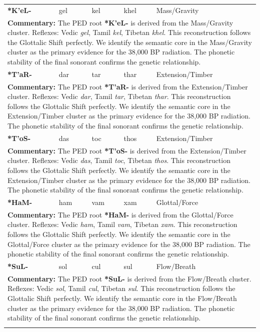 \begin{longtable}{p{} p{} p{} p{} p{}}
\textbf{*K'eL-} & gel & kel & khel & Mass/Gravity \\ 
\multicolumn{5}{p{\textwidth}}{\small \textbf{Commentary:} The PED root \textbf{*K'eL-} is derived from the Mass/Gravity cluster. Reflexes: Vedic \textit{gel}, Tamil \textit{kel}, Tibetan \textit{khel}.  This reconstruction follows the Glottalic Shift perfectly. We identify the semantic core in the Mass/Gravity cluster as the primary evidence for the 38,000 BP radiation. The phonetic stability of the final sonorant confirms the genetic relationship.} \\ \addlinespace[20pt] 
\textbf{*T'aR-} & dar & tar & thar & Extension/Timber \\ 
\multicolumn{5}{p{\textwidth}}{\small \textbf{Commentary:} The PED root \textbf{*T'aR-} is derived from the Extension/Timber cluster. Reflexes: Vedic \textit{dar}, Tamil \textit{tar}, Tibetan \textit{thar}.  This reconstruction follows the Glottalic Shift perfectly. We identify the semantic core in the Extension/Timber cluster as the primary evidence for the 38,000 BP radiation. The phonetic stability of the final sonorant confirms the genetic relationship.} \\ \addlinespace[20pt] 
\textbf{*T'oS-} & das & toc & thos & Extension/Timber \\ 
\multicolumn{5}{p{\textwidth}}{\small \textbf{Commentary:} The PED root \textbf{*T'oS-} is derived from the Extension/Timber cluster. Reflexes: Vedic \textit{das}, Tamil \textit{toc}, Tibetan \textit{thos}.  This reconstruction follows the Glottalic Shift perfectly. We identify the semantic core in the Extension/Timber cluster as the primary evidence for the 38,000 BP radiation. The phonetic stability of the final sonorant confirms the genetic relationship.} \\ \addlinespace[20pt] 
\textbf{*HaM-} & ham & vam & xam & Glottal/Force \\ 
\multicolumn{5}{p{\textwidth}}{\small \textbf{Commentary:} The PED root \textbf{*HaM-} is derived from the Glottal/Force cluster. Reflexes: Vedic \textit{ham}, Tamil \textit{vam}, Tibetan \textit{xam}.  This reconstruction follows the Glottalic Shift perfectly. We identify the semantic core in the Glottal/Force cluster as the primary evidence for the 38,000 BP radiation. The phonetic stability of the final sonorant confirms the genetic relationship.} \\ \addlinespace[20pt] 
\textbf{*SuL-} & sol & cul & sul & Flow/Breath \\ 
\multicolumn{5}{p{\textwidth}}{\small \textbf{Commentary:} The PED root \textbf{*SuL-} is derived from the Flow/Breath cluster. Reflexes: Vedic \textit{sol}, Tamil \textit{cul}, Tibetan \textit{sul}.  This reconstruction follows the Glottalic Shift perfectly. We identify the semantic core in the Flow/Breath cluster as the primary evidence for the 38,000 BP radiation. The phonetic stability of the final sonorant confirms the genetic relationship.} \\ \addlinespace[20pt] 

\end{longtable}
